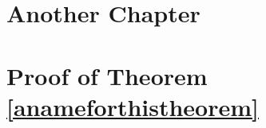 \documentclass[11pt,final,letterpaper,openany]{mytuftsthesis}
\begin{document}
\chapter{Another Chapter}
\someuniquename
\renewcommand{\thechapter}{\Alph{chapter}}
\appendix
\chapter{Proof of Theorem \ref{anameforthistheorem}}


\chapter*{} %


 
                          
{
\singlespacing
\newpage
{}
{}

}
\end{document}
